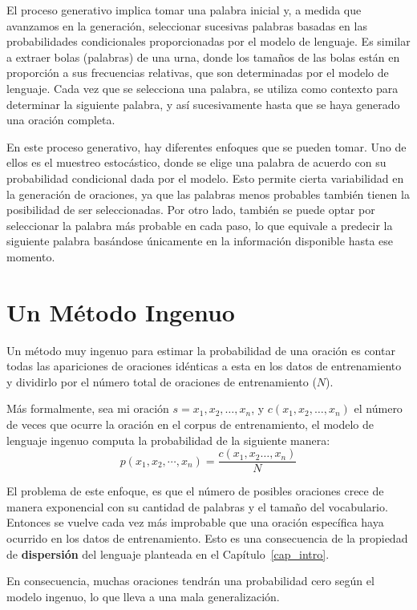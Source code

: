 El proceso generativo implica tomar una palabra inicial y, a medida que avanzamos en la generación, seleccionar sucesivas palabras basadas en las probabilidades condicionales proporcionadas por el modelo de lenguaje. Es similar a extraer bolas (palabras) de una urna, donde los tamaños de las bolas están en proporción a sus frecuencias relativas, que son determinadas por el modelo de lenguaje. Cada vez que se selecciona una palabra, se utiliza como contexto para determinar la siguiente palabra, y así sucesivamente hasta que se haya generado una oración completa.

En este proceso generativo, hay diferentes enfoques que se pueden tomar. Uno de ellos es el muestreo estocástico, donde se elige una palabra de acuerdo con su probabilidad condicional dada por el modelo. Esto permite cierta variabilidad en la generación de oraciones, ya que las palabras menos probables también tienen la posibilidad de ser seleccionadas. Por otro lado, también se puede optar por seleccionar la palabra más probable en cada paso, lo que equivale a predecir la siguiente palabra basándose únicamente en la información disponible hasta ese momento. 


\section{Un Método Ingenuo}
Un método muy ingenuo para estimar la probabilidad de una oración es contar todas las apariciones de  oraciones idénticas a esta en los datos de entrenamiento y dividirlo por el número total de oraciones de entrenamiento ($N$).

Más formalmente, sea mi oración $s=x_1, x_2, \ldots, x_n$, y $c(x_1, x_2, \ldots, x_n)$  el número de veces que ocurre la oración en el corpus de entrenamiento, el modelo de lenguaje ingenuo computa la probabilidad de la siguiente manera: \begin{displaymath}
p(x_1,x_2,\cdots,x_n)=\frac{c(x_1,x_2 \dots,x_n)}{N}
\end{displaymath}

El problema de este enfoque, es que el número de posibles oraciones crece de manera exponencial con su cantidad de palabras y el tamaño del vocabulario. Entonces se vuelve cada vez más improbable que una oración específica haya ocurrido en los datos de entrenamiento. Esto es una consecuencia de la propiedad de \textbf{dispersión} del lenguaje planteada en el Capítulo~\ref{cap_intro}.

En consecuencia, muchas oraciones tendrán una probabilidad cero según el modelo ingenuo, lo que lleva a una mala generalización.

